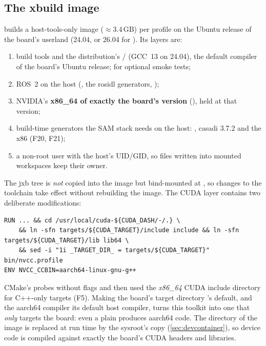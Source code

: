 \documentclass[11pt,a4paper]{article}
\newcommand{\jxb}{\textsf{jxb}}
\newcommand{\finding}[1]{\textsf{\small F#1}}
\begin{document}
\subsection{The xbuild image}
 builds a host-tools-only image ($\approx$3.4\,GB) per profile on the Ubuntu release of
the board's userland (24.04, or 26.04 for ). Its layers are:
\begin{enumerate}
  \item build tools and the distribution's / (GCC~13 on 24.04),
        the default compiler of the board's Ubuntu release;  for optional smoke tests;
  \item ROS~2 on the host (, the rosidl generators, );
  \item NVIDIA's \textbf{x86\_64  of exactly the board's version} (), held at
        that version;
  \item build-time generators the SAM stack needs on the host: , casadi 3.7.2 and the x86
         (\finding{20}, \finding{21});
  \item a non-root user with the host's UID/GID, so files written into mounted workspaces keep their owner.
\end{enumerate}
The \jxb{} tree is \emph{not} copied into the image but bind-mounted at , so changes to the toolchain
take effect without rebuilding the image. The CUDA layer contains two deliberate modifications:
\begin{lstlisting}[language=docker]
RUN ... && cd /usr/local/cuda-${CUDA_DASH/-/.} \
    && ln -sfn targets/${CUDA_TARGET}/include include && ln -sfn targets/${CUDA_TARGET}/lib lib64 \
    && sed -i "1i _TARGET_DIR_ = targets/${CUDA_TARGET}" bin/nvcc.profile
ENV NVCC_CCBIN=aarch64-linux-gnu-g++
\end{lstlisting}
CMake's  probes  without flags and then used the \emph{x86\_64} CUDA include
directory for C++-only targets (\finding{5}). Making the board's target directory 's default, and the
aarch64 compiler its default host compiler, turns this toolkit into one that \emph{only} targets the board: even a
plain \code{nvcc x.cu} produces aarch64 code. The \code{targets/sbsa-linux} directory of the image is replaced at run
time by the sysroot's copy (\cref{sec:devcontainer}), so device code is compiled against exactly the board's CUDA
headers and libraries.
\end{document}
